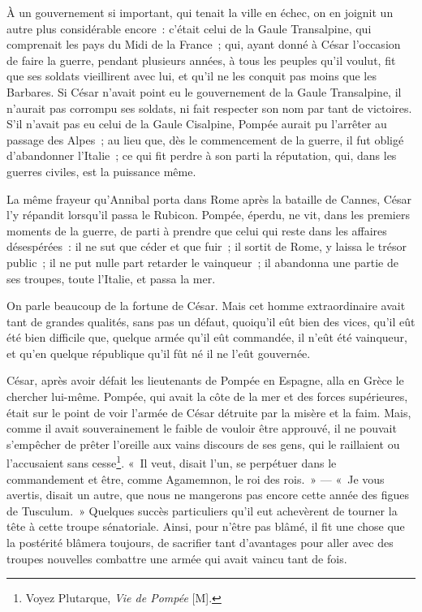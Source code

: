 \documentclass[french,twoside]{book} %
\begin{document}
À un gouvernement si important, qui tenait la ville en échec, on en joignit un autre plus considérable encore : c’était celui de la Gaule Transalpine, qui comprenait les pays du Midi de la France ; qui, ayant donné à César l’occasion de faire la guerre, pendant plusieurs années, à tous les peuples qu’il voulut, fit que ses soldats vieillirent avec lui, et qu’il ne les conquit pas moins que les Barbares. Si César n’avait point eu le gouvernement de la Gaule Transalpine, il n’aurait pas corrompu ses soldats, ni fait respecter son nom par tant de victoires. S’il n’avait pas eu celui de la Gaule Cisalpine, Pompée aurait pu l’arrêter au passage des Alpes ; au lieu que, dès le commencement de la guerre, il fut obligé d’abandonner l’Italie ; ce qui fit perdre à son parti la réputation, qui, dans les guerres civiles, est la puissance même.\par
La même frayeur qu’Annibal porta dans Rome après la bataille de Cannes, César l’y répandit lorsqu’il passa le Rubicon. Pompée, éperdu, ne vit, dans les premiers moments de la guerre, de parti à prendre que celui qui reste dans les affaires désespérées : il ne sut que céder et que fuir ; il sortit de Rome, y laissa le trésor public ; il ne put nulle part retarder le vainqueur ; il abandonna une partie de ses troupes, toute l’Italie, et passa la mer.\par
On parle beaucoup de la fortune de César. Mais cet homme extraordinaire avait tant de grandes qualités, sans pas un défaut, quoiqu’il eût bien des vices, qu’il eût été bien difficile que, quelque armée qu’il eût commandée, il n’eût été vainqueur, et qu’en quelque république qu’il fût né il ne l’eût gouvernée.\par
César, après avoir défait les lieutenants de Pompée en Espagne, alla en Grèce le chercher lui-même. Pompée, qui avait la côte de la mer et des forces supérieures, était sur le point de voir l’armée de César détruite par la misère et la faim. Mais, comme il avait souverainement le faible de vouloir être approuvé, il ne pouvait s’empêcher de prêter l’oreille aux vains discours de ses gens, qui le raillaient ou l’accusaient sans cesse\footnote{Voyez Plutarque, {\itshape Vie de Pompée} [M].}. « Il veut, disait l’un, se perpétuer dans le commandement et être, comme Agamemnon, le roi des rois. » — « Je vous avertis, disait un autre, que nous ne mangerons pas encore cette année des figues de Tusculum. » Quelques succès particuliers qu’il eut achevèrent de tourner la tête à cette troupe sénatoriale. Ainsi, pour n’être pas blâmé, il fit une chose que la postérité blâmera toujours, de sacrifier tant d’avantages pour aller avec des troupes nouvelles combattre une armée qui avait vaincu tant de fois.\par
\end{document}
